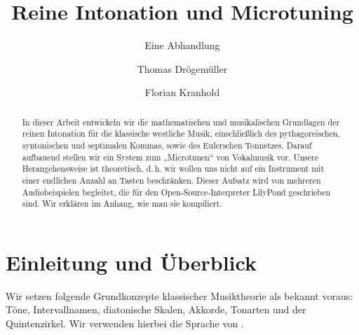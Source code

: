 \documentclass[ngerman,11pt]{scrartcl}
\title     {Reine Intonation und Microtuning}
\author    {Thomas Drögemüller\and Florian Kranhold}
\subtitle  {Eine Abhandlung}
\begin{document}
\maketitle

\begin{abstract}
  In dieser Arbeit entwickeln wir die mathematischen und musikalischen
  Grundlagen  der reinen Intonation für die klassische westliche Musik,
  einschließlich des pythagoreischen, syntonischen und septimalen Kommas, sowie
  des Eulerschen Tonnetzes. Darauf aufbauend stellen wir ein System zum
  „Microtunen“ von Vokalmusik vor. Unsere Herangehensweise ist theoretisch,
  d.\,h. wir wollen uns nicht auf ein Instrument mit einer endlichen Anzahl an
  Tasten beschränken. Dieser Aufsatz wird von mehreren Audiobeispielen
  begleitet, die für den Open-Source-Interpreter LilyPond geschrieben sind. Wir
  erklären im Anhang, wie man sie kompiliert.
\end{abstract}

\section{Einleitung und Überblick}
\label{sec:int}

Wir setzen folgende Grundkonzepte klassischer Musiktheorie als bekannt voraus:
Töne, Intervallnamen, diatonische Skalen, Akkorde, Tonarten und der
Quintenzirkel. Wir verwenden hierbei die Sprache von \cite{Skript}.
\end{document}
